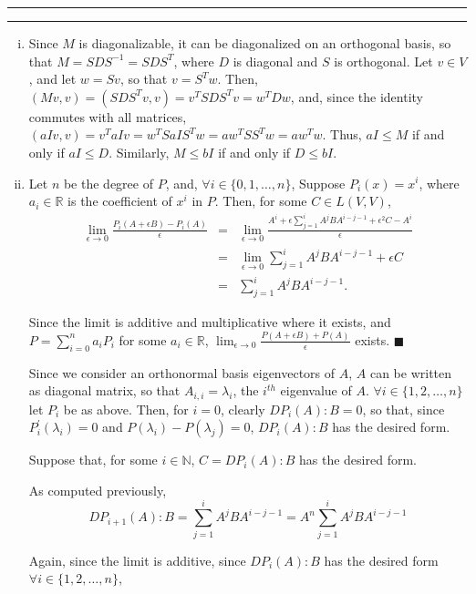 \documentclass[11pt]{article}
\newcounter{questionCounter}
\newcounter{partCounter}[questionCounter]
\newenvironment{question}[2][\arabic{questionCounter}]{%
    \setcounter{partCounter}{0}%
    \vspace{.25in} \hrule \vspace{0.5em}%
        \noindent{\bf #2}%
    \vspace{0.8em} \hrule \vspace{.10in}%
    \addtocounter{questionCounter}{1}%
}{}
\begin{document}
\begin{question}{Exercise 13}
\begin{enumerate}[i)]
\item Since $M$ is diagonalizable, it can be diagonalized on an orthogonal
basis, so that $M = SDS^{-1} = SDS^T$, where $D$ is diagonal and $S$ is
orthogonal. Let $v \in V$, and let $w = Sv$, so that $v = S^Tw$. Then,
$(Mv,v) = (SDS^Tv,v) = v^TSDS^Tv = w^TDw$, and, since the identity commutes
with all matrices, $(aIv,v) = v^TaIv = w^TSaIS^Tw = aw^TSS^Tw = aw^Tw$. Thus,
$aI \leq M$ if and only if $aI \leq D$. Similarly, $M \leq bI$ if and only if
$D \leq bI$.

\item Let $n$ be the degree of $P$, and, $\forall i \in \{0,1,\ldots,n\}$,
Suppose $P_i(x) = x^i$, where $a_i \in \mathbb{R}$ is the coefficient of
$x^i$ in $P$. Then, for some $C \in L(V,V)$,
\begin{eqnarray*}
\lim_{\epsilon \rightarrow 0} \frac{P_i(A + \epsilon B) - P_i(A)}{\epsilon}
 & = & \lim_{\epsilon \rightarrow 0} \frac{A^i +
   \epsilon \sum_{j = 1}^i A^jBA^{i - j - 1} + \epsilon^2 C - A^i}{\epsilon} \\
 & = & \lim_{\epsilon \rightarrow 0}
   \sum_{j = 1}^i A^jBA^{i - j - 1} + \epsilon C \\
 & = & \sum_{j = 1}^i A^jBA^{i - j - 1}.
\end{eqnarray*}

Since the limit is additive and multiplicative where it exists, and
$P = \sum_{i = 0}^n a_i P_i$ for some $a_i \in \mathbb{R}$,
$\lim_{\epsilon \rightarrow 0} \frac{P(A + \epsilon B) + P(A)}{\epsilon}$
exists. \qquad $\blacksquare$

Since we consider an orthonormal basis eigenvectors of $A$, $A$ can be written
as diagonal matrix, so that $A_{i,i} = \lambda_i$, the $i^{th}$ eigenvalue of
$A$. $\forall i \in \{1,2,\ldots,n\}$ let $P_i$ be as above. Then, for
$i = 0$, clearly $DP_i(A) : B = 0$, so that, since
$P_i^{\prime}(\lambda_i) = 0$ and $P(\lambda_i) - P(\lambda_j) = 0$,
$DP_i(A) : B$ has the desired form.

Suppose that, for some $i \in \mathbb{N}$, $C = DP_i (A) : B$ has the desired form.

As computed previously,
\[DP_{i + 1} (A) : B
 = \sum_{j = 1}^iA^jBA^{i - j - 1}
 = A^n \sum_{j = 1}^iA^jBA^{i - j - 1}\]

Again, since the limit is additive, since $DP_i(A) : B$ has the desired form
$\forall i \in \{1,2,\ldots,n\}$, 

\end{enumerate}
\end{question}
\end{document}
